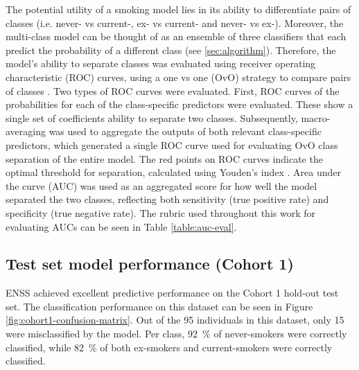 \documentclass[draft]{article} %
\begin{document}
The potential utility of a smoking model lies in its ability to differentiate pairs of classes (i.e. never- vs current-, ex- vs current- and never- vs ex-). Moreover, the multi-class model can be thought of as an ensemble of three classifiers that each predict the probability of a different class (see \ref{sec:algorithm}). Therefore, the model's ability to separate classes was evaluated using receiver operating characteristic (ROC) curves, using a one vs one (OvO) strategy to compare pairs of classes \cite{scikit-learn-roc-example}. Two types of ROC curves were evaluated. First, ROC curves of the probabilities for each of the class-specific predictors were evaluated. These show a single set of coefficients ability to separate two classes. Subsequently, macro-averaging \cite{scikit-learn-roc-example} was used to aggregate the outputs of both relevant class-specific predictors, which generated a single ROC curve used for evaluating OvO class separation of the entire model.
The red points on ROC curves indicate the optimal threshold for separation, calculated using Youden's index \cite{youden1950index}. Area under the curve (AUC) was used as an aggregated score for how well the model separated the two classes, reflecting both sensitivity (true positive rate) and specificity (true negative rate). The rubric used throughout this work for evaluating AUCs can be seen in Table \ref{table:auc-eval}.



\newpage
\subsection{Test set model performance (Cohort 1)} \label{sec:cohort1-performance}
ENSS achieved excellent predictive performance on the Cohort 1 hold-out test set. The classification performance on this dataset can be seen in Figure \ref{fig:cohort1-confusion-matrix}. Out of the 95 individuals in this dataset, only 15 were misclassified by the model. Per class, \SI{92}{\percent} of never-smokers were correctly classified, while \SI{82}{\percent} of both ex-smokers and current-smokers were correctly classified.
\end{document}
